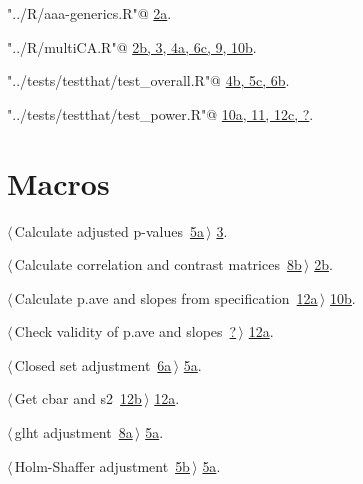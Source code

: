 \documentclass[reqno]{amsart}
\renewcommand{\NWlink}[2]{\hyperlink{#1}{#2}}
\begin{document}
{\small\begin{list}{}{\setlength{\itemsep}{-\parsep}\setlength{\itemindent}{-\leftmargin}}
\item \verb@"../R/aaa-generics.R"@ {\footnotesize {\NWtxtDefBy} \NWlink{nuweb2a}{2a}.}
\item \verb@"../R/multiCA.R"@ {\footnotesize {\NWtxtDefBy} \NWlink{nuweb2b}{2b}\NWlink{nuweb3}{, 3}\NWlink{nuweb4a}{, 4a}\NWlink{nuweb6c}{, 6c}\NWlink{nuweb9}{, 9}\NWlink{nuweb10b}{, 10b}.
}
\item \verb@"../tests/testthat/test_overall.R"@ {\footnotesize {\NWtxtDefBy} \NWlink{nuweb4b}{4b}\NWlink{nuweb5c}{, 5c}\NWlink{nuweb6b}{, 6b}.
}
\item \verb@"../tests/testthat/test_power.R"@ {\footnotesize {\NWtxtDefBy} \NWlink{nuweb10a}{10a}\NWlink{nuweb11}{, 11}\NWlink{nuweb12c}{, 12c}\NWlink{nuweb?}{, ?}.
}
\end{list}}

\section{Macros}


{\small\begin{list}{}{\setlength{\itemsep}{-\parsep}\setlength{\itemindent}{-\leftmargin}}
\item $\langle\,$Calculate adjusted p-values\nobreak\ {\footnotesize \NWlink{nuweb5a}{5a}}$\,\rangle$ {\footnotesize {\NWtxtRefIn} \NWlink{nuweb3}{3}.}
\item $\langle\,$Calculate correlation and contrast matrices\nobreak\ {\footnotesize \NWlink{nuweb8b}{8b}}$\,\rangle$ {\footnotesize {\NWtxtRefIn} \NWlink{nuweb2b}{2b}.}
\item $\langle\,$Calculate p.ave and slopes from specification\nobreak\ {\footnotesize \NWlink{nuweb12a}{12a}}$\,\rangle$ {\footnotesize {\NWtxtRefIn} \NWlink{nuweb10b}{10b}.}
\item $\langle\,$Check validity of p.ave and slopes\nobreak\ {\footnotesize \NWlink{nuweb?}{?}}$\,\rangle$ {\footnotesize {\NWtxtRefIn} \NWlink{nuweb12a}{12a}.}
\item $\langle\,$Closed set adjustment\nobreak\ {\footnotesize \NWlink{nuweb6a}{6a}}$\,\rangle$ {\footnotesize {\NWtxtRefIn} \NWlink{nuweb5a}{5a}.}
\item $\langle\,$Get cbar and s2\nobreak\ {\footnotesize \NWlink{nuweb12b}{12b}}$\,\rangle$ {\footnotesize {\NWtxtRefIn} \NWlink{nuweb12a}{12a}.}
\item $\langle\,$glht adjustment\nobreak\ {\footnotesize \NWlink{nuweb8a}{8a}}$\,\rangle$ {\footnotesize {\NWtxtRefIn} \NWlink{nuweb5a}{5a}.}
\item $\langle\,$Holm-Shaffer adjustment\nobreak\ {\footnotesize \NWlink{nuweb5b}{5b}}$\,\rangle$ {\footnotesize {\NWtxtRefIn} \NWlink{nuweb5a}{5a}.}
\end{list}}
\end{document}

